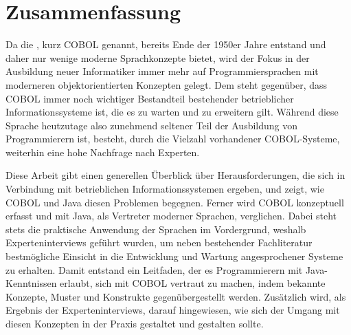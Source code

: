 \chapter*{Zusammenfassung} 

Da die , kurz \mbox{COBOL} genannt, bereits Ende der 1950er Jahre entstand und daher nur wenige moderne Sprachkonzepte bietet, wird der Fokus in der Ausbildung neuer Informatiker immer mehr auf Programmiersprachen mit moderneren objektorientierten Konzepten gelegt. Dem steht gegenüber, dass COBOL immer noch wichtiger Bestandteil bestehender betrieblicher Informationssysteme ist, die es zu warten und zu erweitern gilt. Während diese Sprache heutzutage also zunehmend seltener Teil der Ausbildung von Programmierern ist, besteht, durch die Vielzahl vorhandener COBOL-Systeme, weiterhin eine hohe Nachfrage nach Experten.

Diese Arbeit gibt einen generellen Überblick über Herausforderungen, die sich in Verbindung mit betrieblichen Informationssystemen ergeben, und zeigt, wie COBOL und Java diesen Problemen begegnen. Ferner wird COBOL konzeptuell erfasst und mit Java, als Vertreter moderner Sprachen, verglichen. Dabei steht stets die praktische Anwendung der Sprachen im Vordergrund, weshalb Experteninterviews geführt wurden, um neben bestehender Fachliteratur bestmögliche Einsicht in die Entwicklung und Wartung angesprochener Systeme zu erhalten. Damit entstand ein Leitfaden, der es Programmierern mit Java-Kenntnissen erlaubt, sich mit COBOL vertraut zu machen, indem bekannte Konzepte, Muster und Konstrukte gegenübergestellt werden. Zusätzlich wird, als Ergebnis der Experteninterviews, darauf hingewiesen, wie sich der Umgang mit diesen Konzepten in der Praxis gestaltet und gestalten sollte. 